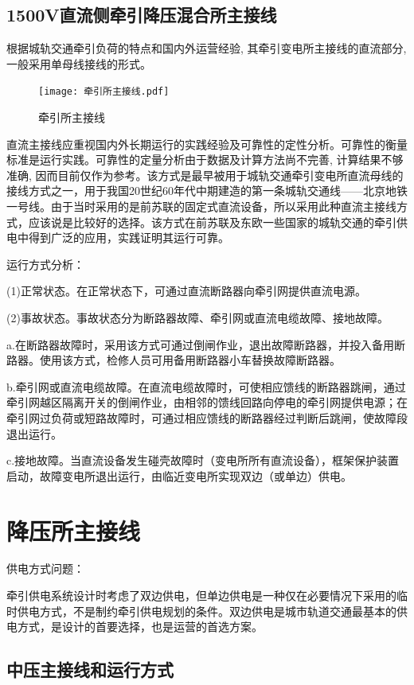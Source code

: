 \subsection{1500V直流侧牵引降压混合所主接线}
根据城轨交通牵引负荷的特点和国内外运营经验, 其牵引变电所主接线的直流部分, 一般采用单母线接线的形式。\par 

\begin{figure}[h]
	\centering
	\texttt{[image: 牵引所主接线.pdf]}
	\caption{牵引所主接线}
	\label{牵引所主接线}
\end{figure}
直流主接线应重视国内外长期运行的实践经验及可靠性的定性分析。可靠性的衡量标准是运行实践。可靠性的定量分析由于数据及计算方法尚不完善, 计算结果不够准确, 因而目前仅作为参考。该方式是最早被用于城轨交通牵引变电所直流母线的接线方式之一，用于我国20世纪60年代中期建造的第一条城轨交通线——北京地铁一号线。由于当时采用的是前苏联的固定式直流设备，所以采用此种直流主接线方式，应该说是比较好的选择。该方式在前苏联及东欧一些国家的城轨交通的牵引供电中得到广泛的应用，实践证明其运行可靠。\par 
运行方式分析：\par 
(1)正常状态。在正常状态下，可通过直流断路器向牵引网提供直流电源。\par 
(2)事故状态。事故状态分为断路器故障、牵引网或直流电缆故障、接地故障。 \par
a.在断路器故障时，采用该方式可通过倒闸作业，退出故障断路器，并投入备用断路器。使用该方式，检修人员可用备用断路器小车替换故障断路器。\par
b.牵引网或直流电缆故障。在直流电缆故障时，可使相应馈线的断路器跳闸，通过牵引网越区隔离开关的倒闸作业，由相邻的馈线回路向停电的牵引网提供电源；在牵引网过负荷或短路故障时，可通过相应馈线的断路器经过判断后跳闸，使故障段退出运行。\par
c.接地故障。当直流设备发生碰壳故障时（变电所所有直流设备），框架保护装置启动，故障变电所退出运行，由临近变电所实现双边（或单边）供电。
\section{降压所主接线}
    供电方式问题：\par 

牵引供电系统设计时考虑了双边供电，但单边供电是一种仅在必要情况下采用的临时供电方式，不是制约牵引供电规划的条件。双边供电是城市轨道交通最基本的供电方式，是设计的首要选择，也是运营的首选方案。\par 

\subsection{中压主接线和运行方式}

